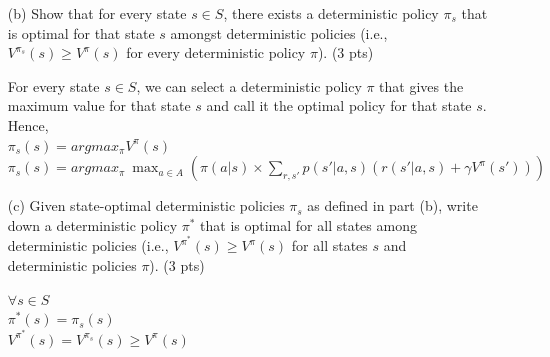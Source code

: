 \documentclass[12pt]{article}
\begin{document}
\begin{itemize}
\item[(b)] Show that for every state $s\in S$, there exists a deterministic policy $\pi_s$ that is optimal for that state $s$ amongst deterministic policies (i.e., $V^{\pi_s}(s) \ge V^{\pi}(s)$ for every deterministic policy $\pi$). (3 pts)

\begin{solution}
For every state $s \in S$, we can select a deterministic policy $\pi$ that gives the maximum value for that state $s$ and call it the optimal policy for that state $s$. Hence, \\
$ \pi_s(s) = argmax_\pi V^\pi (s)$ \\ 
$ \pi_s(s) = argmax_\pi \ \max_{a \in A} (\pi(a|s)\times \sum_{r, s'}p(s'|a,s)(r(s'|a,s) + \gamma V^{\pi}(s')))$
\end{solution}

\item[(c)] Given state-optimal deterministic policies $\pi_s$ as defined in part (b), write down a deterministic policy $\pi^*$ that is optimal for all states among deterministic policies (i.e., $V^{\pi^*}(s) \ge V^{\pi}(s)$ for all states $s$ and deterministic policies $\pi$). (3 pts)

\begin{solution}
$ \forall s \in S$\\
$\pi^*(s) = \pi_s(s)$ \\
$V^{\pi^*}(s) = V^{\pi_s}(s) \ge V^{\pi}(s)$
\end{solution}

\end{itemize}
\end{document}
